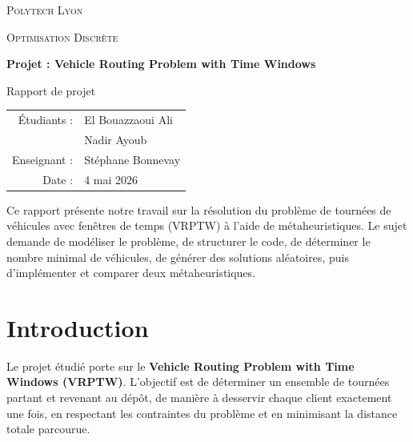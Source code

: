 \documentclass[11pt,a4paper]{article}
\begin{document}
\begin{titlepage}
    \centering
    {\scshape\LARGE Polytech Lyon \par}
    \vspace{1cm}
    {\scshape\Large Optimisation Discrète \par}
    \vspace{1.5cm}
    {\huge\bfseries Projet : Vehicle Routing Problem with Time Windows\par}
    \vspace{1.5cm}
    {\Large Rapport de projet\par}
    \vspace{2cm}
    
    \begin{tabular}{rl}
        Étudiants : & El Bouazzaoui Ali \\
                    & Nadir Ayoub \\
        Enseignant : & Stéphane Bonnevay \\
        Date : & 4 mai 2026
    \end{tabular}
    
    \vfill
    
    \begin{minipage}{0.9\textwidth}
    \small
    Ce rapport présente notre travail sur la résolution du problème de tournées de véhicules avec fenêtres de temps (VRPTW) à l'aide de métaheuristiques. Le sujet demande de modéliser le problème, de structurer le code, de déterminer le nombre minimal de véhicules, de générer des solutions aléatoires, puis d'implémenter et comparer deux métaheuristiques.
    \end{minipage}
    
    \vfill
\end{titlepage}

\tableofcontents
\newpage

\section{Introduction}

Le projet étudié porte sur le \textbf{Vehicle Routing Problem with Time Windows (VRPTW)}. L'objectif est de déterminer un ensemble de tournées partant et revenant au dépôt, de manière à desservir chaque client exactement une fois, en respectant les contraintes du problème et en minimisant la distance totale parcourue.
\end{document}
